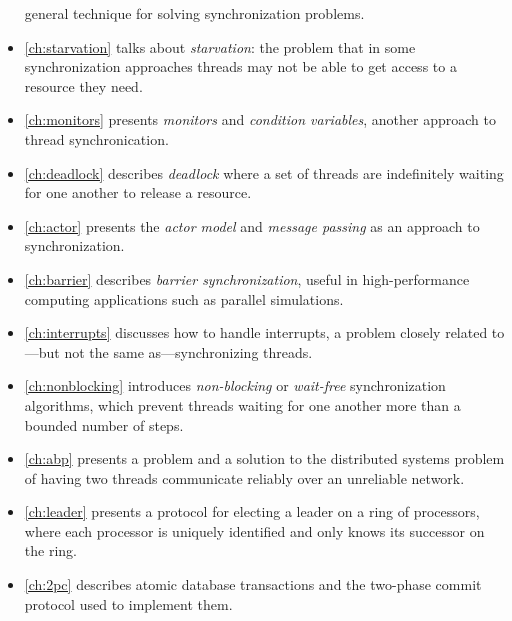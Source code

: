 \documentclass{report}
\begin{document}
\begin{itemize}
general technique for solving synchronization problems.

\item \autoref{ch:starvation} talks about \emph{starvation}:
the problem that in some
synchronization approaches threads may not be able to get access to a
resource they need.
\item \autoref{ch:monitors} presents
\emph{monitors} and \emph{condition variables},
another approach to thread synchronication.
\item \autoref{ch:deadlock} describes \emph{deadlock}
where a set of threads are indefinitely waiting for one another to
release a resource.
\item \autoref{ch:actor} presents the \emph{actor model}
and \emph{message passing} as an approach to synchronization.
\item \autoref{ch:barrier} describes \emph{barrier synchronization},
useful in high-performance computing applications such as parallel simulations.
\item \autoref{ch:interrupts} discusses how to handle interrupts,
a problem closely related to---but not the same as---synchronizing threads.
\item \autoref{ch:nonblocking} introduces \emph{non-blocking} or
\emph{wait-free} synchronization algorithms,
which prevent threads waiting for one another more than a bounded number of
steps.
\item \autoref{ch:abp} presents a problem and a solution to the distributed
systems problem of having two threads communicate reliably over an unreliable
network.
\item \autoref{ch:leader} presents a protocol for electing a leader on
a ring of processors, where each processor is uniquely identified and 
only knows its successor on the ring.
\item \autoref{ch:2pc} describes atomic database transactions and the two-phase commit protocol used to implement them.

\end{itemize}
\end{document}
